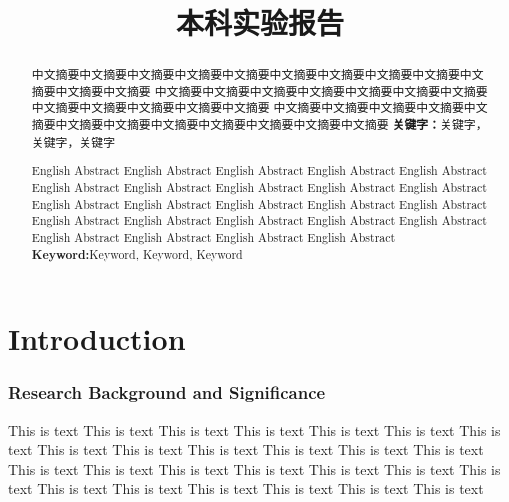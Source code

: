 \documentclass[a4paper]{uestcreport}
\title{本科实验报告}
\begin{document}
\thispagestyle{empty}
\makecover

\setcounter{page}{1} %


\begin{abstract}
    中文摘要中文摘要中文摘要中文摘要中文摘要中文摘要中文摘要中文摘要中文摘要中文摘要中文摘要中文摘要
	中文摘要中文摘要中文摘要中文摘要中文摘要中文摘要中文摘要中文摘要中文摘要中文摘要中文摘要中文摘要
	中文摘要中文摘要中文摘要中文摘要中文摘要中文摘要中文摘要中文摘要中文摘要中文摘要中文摘要中文摘要
    \newline
    \textbf{关键字：}关键字，关键字，关键字
\end{abstract}
\thispagestyle{fancy}
\fancyhead[L]{}
\fancyhead[R]{}
\newpage

\begin{abstract}
    English Abstract English Abstract English Abstract English Abstract English Abstract English Abstract 
	English Abstract English Abstract English Abstract English Abstract English Abstract English Abstract 
	English Abstract English Abstract English Abstract English Abstract English Abstract English Abstract 
	English Abstract English Abstract English Abstract English Abstract English Abstract English Abstract 
    \newline
    \textbf{Keyword:}Keyword, Keyword, Keyword
\end{abstract}
\thispagestyle{fancy}
\fancyhead[L]{}
\fancyhead[R]{}
\newpage

\thispagestyle{fancy}
\fancyhead[L]{}
\fancyhead[R]{}
\tableofcontents
\newpage

\setcounter{page}{1} %

\thispagestyle{fancy}
\fancyhead[L]{}
\fancyhead[R]{}
\setcounter{section}{0}
\part{Introduction}
\section{Research Background and Significance}
This is text This is text This is text This is text This is text This is text This is text This is text This is text 
This is text This is text This is text This is text This is text This is text This is text This is text This is text 
This is text This is text This is text This is text This is text This is text This is text This is text 
\end{document}
